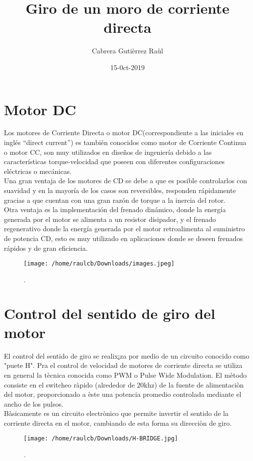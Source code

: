 \documentclass[11pt]{article}
\title{\textbf{Giro de un moro de corriente directa}}
\author{Cabrera Gutièrrez Raùl}
\date{15-0ct-2019}
\begin{document}
\maketitle

\section{Motor DC}
 Los motores de Corriente Directa o motor DC(correspondiente a las iniciales en inglés “direct current”) es también conocidos como motor de Corriente Continua o motor CC, son  muy utilizados en diseños de ingeniería debido a las características torque-velocidad que poseen con diferentes configuraciones eléctricas o mecánicas.
 \\
 Una gran ventaja de los motores de CD se debe a que es posible controlarlos con suavidad y en la mayoría de los casos son reversibles, responden rápidamente gracias a que cuentan con una gran razón de torque a la inercia del rotor. 
 \\
 Otra ventaja es la implementación del frenado dinámico, donde la energía generada por el motor se alimenta a un resistor disipador, y el frenado regenerativo donde la energía generada por el motor retroalimenta al suministro de potencia CD, esto es muy utilizado en aplicaciones donde se deseen frenados rápidos y de gran eficiencia.
 \begin{figure}[htp]
\centering
\texttt{[image: /home/raulcb/Downloads/images.jpeg]}
\caption{.}
\label{.}
\end{figure}

\section{Control del sentido de giro del motor}
El control del sentido de giro se realix¡za por medio de un circuito conocido como "puete H".
Pra el control de velocidad de motores de corriente directa se utiliza en general la tècnica conocida como PWM o Pulse Wide Modulation. El mètodo consiste en el switcheo ràpido (alrededor de 20khz) de la fuente de alimentaciòn del motor, proporcionado a èste una potencia promedio controlada mediante el ancho de los pulsos.
\\
Bàsicamente es un circuito electrònico que permite invertir el sentido de la corriente directa en el motor, cambiando de esta forma su direcciòn de giro.
\begin{figure}[htp]
\centering
\texttt{[image: /home/raulcb/Downloads/H-BRIDGE.jpg]}
\caption{.}
\label{.}
\end{figure}
\end{document}
